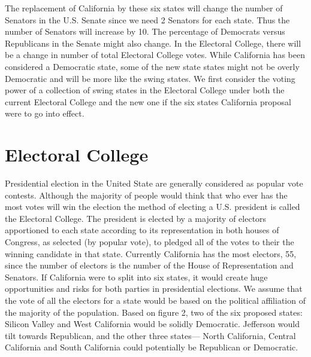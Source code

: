 \documentclass[12pt]{article}
\begin{document}
The replacement of California by these six states will change the number of Senators in the U.S. Senate since we need 2 Senators for each state. Thus the number of Senators will increase by 10. The percentage of Democrats versus Republicans in the Senate might also change. In the Electoral College, there will be a change in number of total Electoral College votes. While California has been considered a Democratic state, some of the new state states might not be overly Democratic and will be more like the swing states. We first consider the voting power of a collection of swing states in the Electoral College under both the current Electoral College and the new one if the six states California proposal were to go into effect.


\section{Electoral College}
Presidential election in the United State are generally considered as popular vote contests. Although the majority of people would think that who ever has the most votes will win the election the method of electing a U.S. president is called the Electoral College. The president is elected by a majority of electors apportioned to each state according to its representation in both houses of Congress, as selected (by popular vote), to pledged all of the votes to their the winning candidate in that state. Currently California has the most electors, 55, since the number of electors is the number of the House of Representation and Senators. If California were to split into six states, it would create huge opportunities and risks for both parties in presidential elections. We assume that the vote of all the electors for a state would be based on the political affiliation of the majority of the population.
Based on figure 2, two of the six proposed states: Silicon Valley and West California would be solidly Democratic. Jefferson would tilt towards Republican, and the other three states--- North California, Central California and South California could potentially be Republican or Democratic. 



\end{document}
